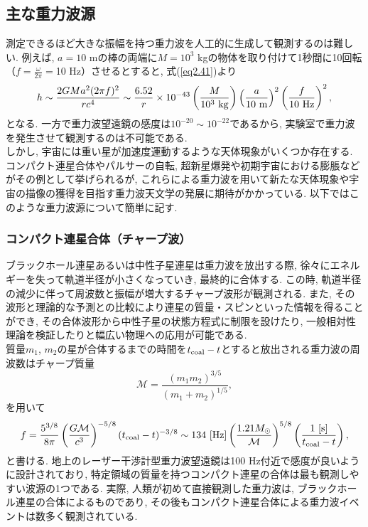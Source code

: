 \subsection{主な重力波源}
測定できるほど大きな振幅を持つ重力波を人工的に生成して観測するのは難しい. 例えば, $a=10$ mの棒の両端に$M=10^3$ kgの物体を取り付けて1秒間に10回転（$f=\frac{\omega}{2\pi}=$10 Hz）させるとすると, 式(\ref{eq2.41})より
\begin{equation*}
h\sim\frac{2GMa^2(2\pi f)^2}{rc^4}\sim\frac{6.52}{r}\times10^{-43}\left(\frac{M}{10^{3}\,\,{\rm kg}}\right)\left(\frac{a}{10\,\,{\rm m}}\right)^2\left(\frac{f}{10\,\,{\rm Hz}}\right)^2,
\end{equation*}
となる. 一方で重力波望遠鏡の感度は$10^{-20}\sim10^{-22}$であるから, 実験室で重力波を発生させて観測するのは不可能である. \\
\quad しかし, 宇宙には重い星が加速度運動するような天体現象がいくつか存在する. コンパクト連星合体やパルサーの自転, 超新星爆発や初期宇宙における膨脹などがその例として挙げられるが, これらによる重力波を用いて新たな天体現象や宇宙の描像の獲得を目指す重力波天文学の発展に期待がかかっている. 以下ではこのような重力波源について簡単に記す. 
\subsubsection{コンパクト連星合体（チャープ波）}
\vskip3mm
ブラックホール連星あるいは中性子星連星は重力波を放出する際, 徐々にエネルギーを失って軌道半径が小さくなっていき, 最終的に合体する. この時, 軌道半径の減少に伴って周波数と振幅が増大するチャープ波形が観測される. また, その波形と理論的な予測との比較により連星の質量・スピンといった情報を得ることができ, その合体波形から中性子星の状態方程式に制限を設けたり, 一般相対性理論を検証したりと幅広い物理への応用が可能である. \\
\quad 質量$m_1$, $m_2$の星が合体するまでの時間を$t_{\rm coal}-t$とすると放出される重力波の周波数はチャープ質量
\begin{equation}
\mathcal{M}=\frac{(m_1m_2)^{3/5}}{(m_1+m_2)^{1/5}},
\end{equation}
を用いて
\begin{equation}
f=\frac{5^{3/8}}{8\pi}\left(\frac{G\mathcal{M}}{c^3}\right)^{-5/8}(t_{\rm coal}-t)^{-3/8}\sim134\,\,[{\rm Hz}]\left(\frac{1.21M_{\odot}}{\mathcal{M}}\right)^{5/8}\left(\frac{1\,\,[{\rm s}]}{t_{\rm coal}-t}\right),
\end{equation}
と書ける. 地上のレーザー干渉計型重力波望遠鏡は100 Hz付近で感度が良いように設計されており, 特定領域の質量を持つコンパクト連星の合体は最も観測しやすい波源の1つである. 実際, 人類が初めて直接観測した重力波は, ブラックホール連星の合体によるものであり\cite{5}, その後もコンパクト連星合体による重力波イベントは数多く観測されている. 

